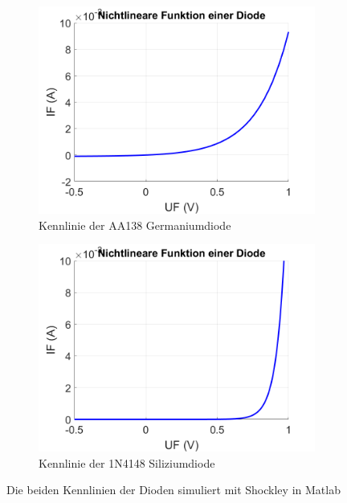 \documentclass{article}
\begin{document}
\begin{figure}[h]
  \centering
  \begin{subfigure}[b]{0.4\textwidth}
    \centering
    \includegraphics[width=\textwidth]{../assets/images/EL1P2/VorbereitungAA138.png}
    \caption{Kennlinie der AA138 Germaniumdiode}
  \end{subfigure}
  \hfill
  \begin{subfigure}[b]{0.4\textwidth}
    \centering
    \includegraphics[width=\textwidth]{../assets/images/EL1P2/Vorbereitung1N4148.png}
    \caption{Kennlinie der 1N4148 Siliziumdiode}
  \end{subfigure}
  \caption{Die beiden Kennlinien der Dioden simuliert mit Shockley in Matlab}
\end{figure}
\end{document}
